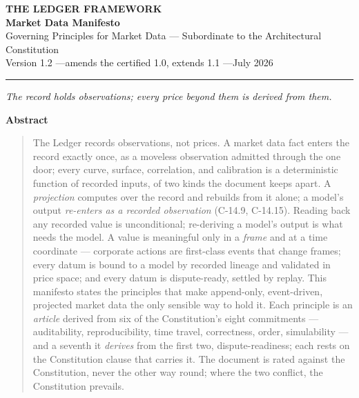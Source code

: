 \documentclass[11pt,a4paper]{article}
\begin{document}
\begin{center}
  {\LARGE\bfseries THE LEDGER FRAMEWORK}\\[0.9em]
  {\large\bfseries Market Data Manifesto}\\[0.6em]
  {\normalsize Governing Principles for Market Data ---
   Subordinate to the Architectural Constitution}\\[1.4em]
  Version 1.2 \quad---\quad amends the certified 1.0, extends 1.1 \quad---\quad July 2026
\end{center}

\vspace{0.6em}
\begin{center}\rule{0.35\linewidth}{0.4pt}\end{center}
\vspace{0.6em}

\begin{center}\itshape
The record holds observations; every price beyond them is derived from them.
\end{center}

\vspace{0.4em}

\begin{center}\textbf{Abstract}\end{center}
\begin{quote}
The Ledger records observations, not prices. A market data fact enters
the record exactly once, as a moveless observation admitted through the
one door; every curve, surface, correlation, and calibration is a
deterministic function of recorded inputs, of two kinds the document
keeps apart. A \emph{projection} computes over the record and rebuilds
from it alone; a model's output \emph{re-enters as a recorded
observation} (C-14.9, C-14.15). Reading back any recorded value is
unconditional; re-deriving a model's output is what needs the model. A
value is meaningful only in a \emph{frame} and at a time coordinate ---
corporate actions are first-class events that change frames; every datum
is bound to a model by recorded lineage and validated in price space;
and every datum is dispute-ready, settled by replay. This manifesto
states the principles that make append-only, event-driven, projected
market data the only sensible way to hold it. Each principle is an
\emph{article} derived from six of the Constitution's eight commitments
--- auditability, reproducibility, time travel, correctness, order,
simulability --- and a seventh it \emph{derives} from the first two,
dispute-readiness; each rests on the Constitution clause that carries it.
The document is rated against the Constitution, never the other way round;
where the two conflict, the Constitution prevails.
\end{quote}
\end{document}
